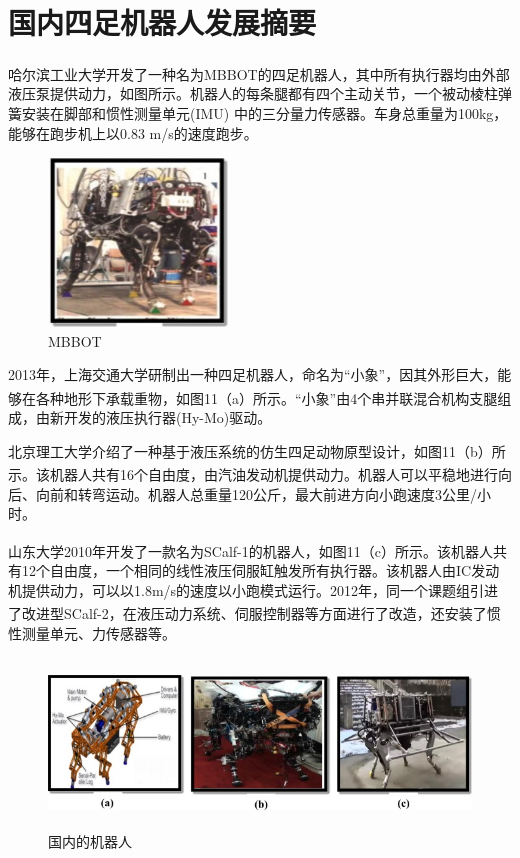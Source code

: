 \documentclass[12pt,a4paper]{ctexart}
\newcommand{\supercite}[1]{\textsuperscript{\cite{#1}}}
\begin{document}
{\section{国内四足机器人发展摘要}
哈尔滨工业大学开发了一种名为MBBOT的四足机器人\supercite{24}，其中所有执行器均由外部液压泵提供动力，如图所示。机器人的每条腿都有四个主动关节，一个被动棱柱弹簧安装在脚部和惯性测量单元(IMU) 中的三分量力传感器。车身总重量为100kg，能够在跑步机上以0.83 m/s的速度跑步。
\begin{figure}[H]
	\centering
	\includegraphics[height=4.5cm]{IMG_11.jpg}
	\caption{MBBOT}
\end{figure}
2013年，上海交通大学研制出一种四足机器人，命名为“小象”，因其外形巨大，能够在各种地形下承载重物，如图11（a）所示\supercite{25}。“小象”由4个串并联混合机构支腿组成，由新开发的液压执行器(Hy-Mo)驱动。

北京理工大学介绍了一种基于液压系统的仿生四足动物原型设计，如图11（b）所示\supercite{26}。该机器人共有16个自由度，由汽油发动机提供动力。机器人可以平稳地进行向后、向前和转弯运动。机器人总重量120公斤，最大前进方向小跑速度3公里/小时。

山东大学2010年开发了一款名为SCalf-1的机器人\supercite{27}，如图11（c）所示。该机器人共有12个自由度，一个相同的线性液压伺服缸触发所有执行器。该机器人由IC发动机提供动力，可以以1.8m/s的速度以小跑模式运行。2012年，同一个课题组引进了改进型SCalf-2\supercite{28}，在液压动力系统、伺服控制器等方面进行了改造，还安装了惯性测量单元、力传感器等。
\begin{figure}[H]
	\centering
	\includegraphics[height=4.5cm]{IMG_10.jpg}
	\caption{国内的机器人}
\end{figure}
}
\end{document}
